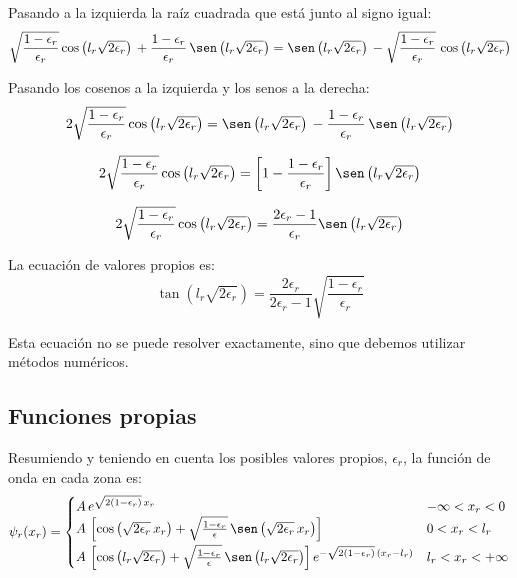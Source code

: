 Pasando a la izquierda la raíz cuadrada que está junto al signo igual:
\[
\sqrt{\frac{1-\epsilon_r}{\epsilon_r}}
\cos\left(l_r\sqrt{2\epsilon_r}\right)\,
  + \frac{1-\epsilon_r}{\epsilon_r}\,
         \sen\left(l_r\sqrt{2\epsilon_r}\right)
=
  \sen\left(l_r\sqrt{2\epsilon_r}\right)\,
  - \sqrt{\frac{1-\epsilon_r}{\epsilon_r}}\,
       \cos\left(l_r\sqrt{2\epsilon_r}\right)
\]

Pasando los cosenos a la izquierda y los senos a la derecha:
\[
2\sqrt{\frac{1-\epsilon_r}{\epsilon_r}}
\cos\left(l_r\sqrt{2\epsilon_r}\right) 
=
  \sen\left(l_r\sqrt{2\epsilon_r}\right)\,
  - \frac{1-\epsilon_r}{\epsilon_r}\,
       \sen\left(l_r\sqrt{2\epsilon_r}\right)
\]

\[
2\sqrt{\frac{1-\epsilon_r}{\epsilon_r}}
\cos\left(l_r\sqrt{2\epsilon_r}\right) 
=
  \left[1-\frac{1-\epsilon_r}{\epsilon_r}\right]
  \sen\left(l_r\sqrt{2\epsilon_r}\right)
\]

\[
2\sqrt{\frac{1-\epsilon_r}{\epsilon_r}}
\cos\left(l_r\sqrt{2\epsilon_r}\right) 
=
  \frac{2\epsilon_r-1}{\epsilon_r}
  \sen\left(l_r\sqrt{2\epsilon_r}\right)
\]

La ecuación de valores propios es:
\begin{equation}
\label{eigenvalue_eq}
\tan\left(l_r\sqrt{2\epsilon_r}\right)
=
\frac{2\epsilon_r}{2\epsilon_r-1}
\sqrt{\frac{1-\epsilon_r}{\epsilon_r}}
\end{equation}

Esta ecuación no se puede resolver exactamente, sino que debemos utilizar
métodos numéricos.

\subsection{Funciones propias}
Resumiendo y teniendo en cuenta los posibles valores propios, $\epsilon_r$,
la función de onda en cada zona es:
\begin{equation}
\label{wavefunctions}
\psi_r(x_r)=
\begin{cases}
A\,e^{\sqrt{2(1-\epsilon_r)}\,x_r}
& -\infty<x_r<0\\
A\,\left[\cos\left(\sqrt{2\epsilon_r}\,x_r\right)
  + \sqrt{\frac{1-\epsilon_r}{\epsilon}}\,
    \sen\left(\sqrt{2\epsilon_r}\,x_r\right)\right]
& 0<x_r<l_r\phantom{\rule[-9pt]{0em}{0em}}\\
A\,\left[\cos\left(l_r\sqrt{2\epsilon_r}\right)
  + \sqrt{\frac{1-\epsilon_r}{\epsilon}}\,
    \sen\left(l_r\sqrt{2\epsilon_r}\right)\right]
    e^{-\sqrt{2(1-\epsilon_r)}\,(x_r-l_r)}
& l_r<x_r<+\infty
\end{cases}
\end{equation}

